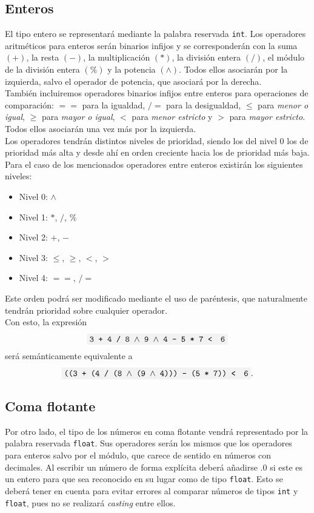 \documentclass[10pt a4paper]{article}
\newcommand{\code}[1]{\colorbox{light-gray}{\texttt{#1}}}
\numberwithin{equation}{section}
\begin{document}
\subsection{Enteros}
El tipo entero se representará mediante la palabra reservada \code{int}. Los operadores aritméticos para enteros serán binarios infijos y se corresponderán con la suma $(+)$, la resta $(-)$, la multiplicación $(*)$, la división entera $(/)$, el módulo de la división entera $(\%)$ y la potencia $(\wedge)$. Todos ellos asociarán por la izquierda, salvo el operador de potencia, que asociará por la derecha. \\
\newline
También incluiremos operadores binarios infijos entre enteros para operaciones de comparación: $==$ para la igualdad, $/=$ para la desigualdad, $\leq$ para \textit{menor o igual}, $\geq$ para \textit{mayor o igual}, $<$ para \textit{menor estricto} y $>$ para \textit{mayor estricto}. Todos ellos asociarán una vez más por la izquierda. \\
\newline
Los operadores tendrán distintos niveles de prioridad, siendo los del nivel 0 los de prioridad más alta y desde ahí en orden creciente hacia los de prioridad más baja. Para el caso de los mencionados operadores entre enteros existirán los siguientes niveles:
\begin{itemize}
    \item Nivel 0: $\wedge$
    \item Nivel 1: $*$, $/$, $\%$
    \item Nivel 2: $+$, $-$
    \item Nivel 3: $\leq$, $\geq$, $<$, $>$
    \item Nivel 4: $==$, $/=$
\end{itemize}
Este orden podrá ser modificado mediante el uso de paréntesis, que naturalmente tendrán prioridad sobre cualquier operador. \\
\newline
Con esto, la expresión
\begin{equation*}
    \code{3 + 4 / 8 $\wedge$ 9 $\wedge$ 4 - 5 * 7 < $\:\:$6}
\end{equation*}
será semánticamente equivalente a 
\begin{equation*}
    \code{((3 + (4 / (8 $\wedge$ (9 $\wedge$ 4))) - (5 * 7)) < $\:\:$6}.
\end{equation*}
\subsection{Coma flotante}
Por otro lado, el tipo de los números en coma flotante vendrá representado por la palabra reservada \code{float}. Sus operadores serán los mismos que los operadores para enteros salvo por el módulo, que carece de sentido en números con decimales. Al escribir un número de forma explícita deberá añadirse .0 si este es un entero para que sea reconocido en su lugar como de tipo \code{float}. Esto se deberá tener en cuenta para evitar errores al comparar números de tipos \code{int} y \code{float}, pues no se realizará \textit{casting} entre ellos.
\end{document}
